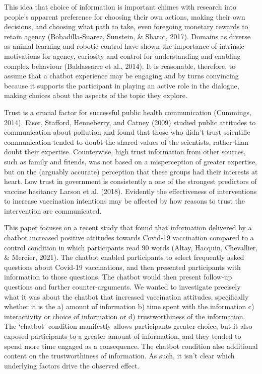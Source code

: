 \documentclass[
  english,
  ,jou,floatsintext]{apa6}
\begin{document}
This idea that choice of information is important chimes with research into people's apparent preference for choosing their own actions, making their own decisions, and choosing what path to take, even foregoing monetary rewards to retain agency (Bobadilla-Suarez, Sunstein, \& Sharot, 2017). Domains as diverse as animal learning and robotic control have shown the importance of intrinsic motivations for agency, curiosity and control for understanding and enabling complex behaviour (Baldassarre et al., 2014). It is reasonable, therefore, to assume that a chatbot experience may be engaging and by turns convincing because it supports the participant in playing an active role in the dialogue, making choices about the aspects of the topic they explore.

Trust is a crucial factor for successful public health communication (Cummings, 2014). Eiser, Stafford, Henneberry, and Catney (2009) studied public attitudes to communication about pollution and found that those who didn't trust scientific communication tended to doubt the shared values of the scientists, rather than doubt their expertise. Counterwise, high trust information from other sources, such as family and friends, was not based on a misperception of greater expertise, but on the (arguably accurate) perception that these groups had their interests at heart. Low trust in government is consistently a one of the strongest predictors of vaccine hesitancy Larson et al. (2018). Evidently the effectiveness of interventions to increase vaccination intentions may be affected by how reasons to trust the intervention are communicated.

This paper focuses on a recent study that found that information delivered by a chatbot increased positive attitudes towards Covid-19 vaccination compared to a control condition in which participants read 90 words (Altay, Hacquin, Chevallier, \& Mercier, 2021). The chatbot enabled participants to select frequently asked questions about Covid-19 vaccinations, and then presented participants with information to those questions. The chatbot would then present follow-up questions and further counter-arguments. We wanted to investigate precisely what it was about the chatbot that increased vaccination attitudes, specifically whether it is the a) amount of information b) time spent with the information c) interactivity or choice of information or d) trustworthiness of the information. The `chatbot' condition manifestly allows participants greater choice, but it also exposed participants to a greater amount of information, and they tended to spend more time engaged as a consequence. The chatbot condition also additional content on the trustworthiness of information. As such, it isn't clear which underlying factors drive the observed effect.
\end{document}
